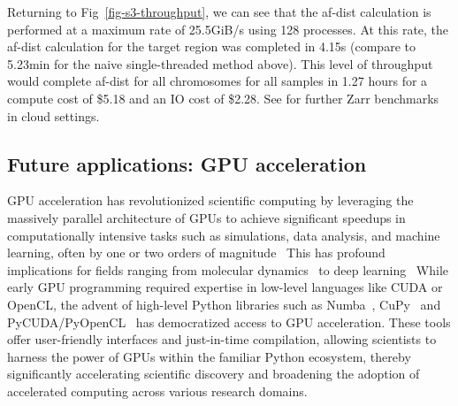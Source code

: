 \documentclass[a4paper,num-refs]{oup-contemporary}
\begin{document}
Returning to Fig~\ref{fig-s3-throughput}, we can see that the af-dist
calculation is performed at a maximum rate of 25.5GiB/s using 128
processes. At this rate, the af-dist calculation for the target region
was completed in 4.15s (compare to 5.23min for the naive single-threaded
method above).
This level of throughput would complete af-dist for all chromosomes for all samples
in 1.27 hours for a compute cost of \$5.18 and an IO cost of \$2.28.
See \citep{durbin2020task,moore2021ome,gowan2022using} for further Zarr
benchmarks in cloud settings.

\subsection{Future applications: GPU acceleration}
GPU acceleration has revolutionized scientific computing by leveraging the
massively parallel architecture of GPUs to achieve significant speedups in
computationally intensive tasks such as simulations, data analysis, and machine
learning, often by one or two orders of magnitude~\citep{nickolls2010gpu,
mittal2014survey,owens2008gpu}
This has profound implications for
fields ranging from molecular dynamics~\citep{stone2007accelerating}
to deep learning~\citep{lecun2015deep}
While early GPU programming required expertise in
low-level languages like CUDA or OpenCL, the advent of high-level Python
libraries such as Numba~\citep{lam2015numba}, CuPy~\citep{okuta2017cupy} 
and
PyCUDA/PyOpenCL~\citep{klockner2012pycuda}
has democratized access to GPU acceleration.
These tools offer user-friendly interfaces and just-in-time compilation,
allowing scientists to harness the power of GPUs within the familiar Python
ecosystem, thereby significantly accelerating scientific discovery and
broadening the adoption of accelerated computing across various research
domains.

\end{document}
